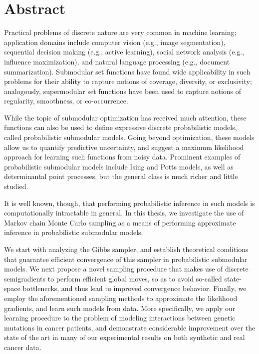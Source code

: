 


\cleardoublepage
\section*{\centering Abstract}
\vspace{1em}
Practical problems of discrete nature are very common in machine learning; application domains include computer vision (e.g., image segmentation), sequential decision making (e.g., active learning), social network analysis (e.g., influence maximization), and natural language processing (e.g., document summarization).
Submodular set functions have found wide applicability in such problems for their ability to capture notions of coverage, diversity, or exclusivity; analogously, supermodular set functions have been used to capture notions of regularity, smoothness, or co-occurrence.

While the topic of submodular optimization has received much attention, these functions can also be used to define expressive discrete probabilistic models, called probabilistic submodular models.
Going beyond optimization, these models allow us to quantify predictive uncertainty, and suggest a maximum likelihood approach for learning such functions from noisy data.
Prominent examples of probabilistic submodular models include Ising and Potts models, as well as determinantal point processes, but the general class is much richer and little studied.

It is well known, though, that performing probabilistic inference in such models is computationally intractable in general.
In this thesis, we investigate the use of Markov chain Monte Carlo sampling as a means of performing approximate inference in probabilistic submodular models.

We start with analyzing the Gibbs sampler, and establish theoretical conditions that guarantee efficient convergence of this sampler in probabilistic submodular models.
We next propose a novel sampling procedure that makes use of discrete semigradients to perform efficient global moves, so as to avoid so-called state-space bottlenecks, and thus lead to improved convergence behavior.
Finally, we employ the aforementioned sampling methods to approximate the likelihood gradients, and learn such models from data.
More specifically, we apply our learning procedure to the problem of modeling interactions between genetic mutations in cancer patients, and demonstrate considerable improvement over the state of the art in many of our experimental results on both synthetic and real cancer data.


